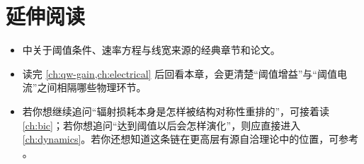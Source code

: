 \section*{延伸阅读}
\begin{itemize}
  \item \cite{coldren2012,siegman1986,henry1982} 中关于阈值条件、速率方程与线宽来源的经典章节和论文。

  \item 读完 \cref{ch:qw-gain,ch:electrical} 后回看本章，会更清楚“阈值增益”与“阈值电流”之间相隔哪些物理环节。

  \item 若你想继续追问“辐射损耗本身是怎样被结构对称性重排的”，可接着读 \cref{ch:bic}；若你想追问“达到阈值以后会怎样演化”，则应直接进入 \cref{ch:dynamics}。若你还想知道这条链在更高层有源自洽理论中的位置，可参考 \cite{tureci2007salt,tureci2009salt}。
\end{itemize}
